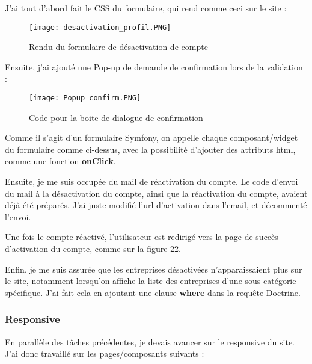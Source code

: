 J'ai tout d'abord fait le CSS du formulaire, qui rend comme ceci sur le site : 

\begin{figure}[H]
    \texttt{[image: desactivation\_profil.PNG]}
    \caption{Rendu du formulaire de désactivation de compte}
\end{figure}

Ensuite, j'ai ajouté une Pop-up de demande de confirmation lors de la validation : 

\begin{figure}[H]
    \texttt{[image: Popup\_confirm.PNG]}
    \caption{Code pour la boite de dialogue de confirmation}
\end{figure}

Comme il s'agit d'un formulaire Symfony, on appelle chaque composant/widget du formulaire comme ci-dessus, avec la possibilité d'ajouter des attributs html, comme une fonction \textbf{onClick}.

Ensuite, je me suis occupée du mail de réactivation du compte. Le code d'envoi du mail à la désactivation du compte, ainsi que la réactivation du compte, avaient déjà été préparés.
J'ai juste modifié l'url d'activation dans l'email, et décommenté l'envoi.

Une fois le compte réactivé, l'utilisateur est redirigé vers la page de succès d'activation du compte, comme sur la figure 22.

Enfin, je me suis assurée que les entreprises désactivées n'apparaissaient plus sur le site, notamment lorsqu'on affiche la liste des entreprises d'une sous-catégorie spécifique. 
J'ai fait cela en ajoutant une clause \textbf{where} dans la requête Doctrine.


\subsubsection{Responsive}


En parallèle des tâches précédentes, je devais avancer sur le responsive du site.
J'ai donc travaillé sur les pages/composants suivants :

